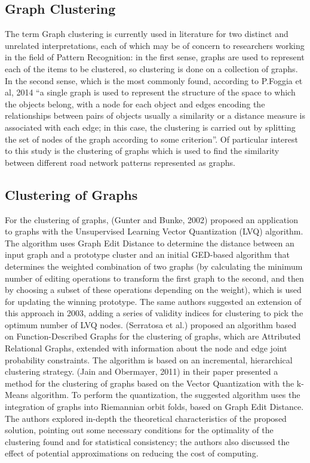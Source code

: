 \subsection{Graph Clustering}
The term Graph clustering is currently used in literature for two distinct and unrelated interpretations, each of which may be of concern to researchers working in the field of Pattern Recognition: in the first sense, graphs are used to represent each of the items to be clustered, so clustering is done on a collection of graphs. In the second sense, which is the most commonly found, according to P.Foggia et al, 2014 “a single graph is used to represent the structure of the space to which the objects belong, with a node for each object and edges encoding the relationships between pairs of objects usually a similarity or a distance measure is associated with each edge; in this case, the clustering is carried out by splitting the set of nodes of the graph according to some criterion”. Of particular interest to this study is the clustering of graphs which is used to find the similarity between different road network patterns represented as graphs.

\subsection{Clustering of Graphs}
For the clustering of graphs, (Gunter and Bunke, 2002) proposed an application to graphs with the Unsupervised Learning Vector Quantization (LVQ) algorithm. The algorithm uses Graph Edit Distance to determine the distance between an input graph and a prototype cluster and an initial GED-based algorithm that determines the weighted combination of two graphs (by calculating the minimum number of editing operations to transform the first graph to the second, and then by choosing a subset of these operations depending on the weight), which is used for updating the winning prototype. The same authors suggested an extension of this approach in 2003, adding a series of validity indices for clustering to pick the optimum number of LVQ nodes. (Serratosa et al.) proposed an algorithm based on Function-Described Graphs for the clustering of graphs, which are Attributed Relational Graphs, extended with information about the node and edge joint probability constraints. The algorithm is based on an incremental, hierarchical clustering strategy. (Jain and Obermayer, 2011) in their paper presented a method for the clustering of graphs based on the Vector Quantization with the k-Means algorithm. To perform the quantization, the suggested algorithm uses the integration of graphs into Riemannian orbit folds, based on Graph Edit Distance. The authors explored in-depth the theoretical characteristics of the proposed solution, pointing out some necessary conditions for the optimality of the clustering found and for statistical consistency; the authors also discussed the effect of potential approximations on reducing the cost of computing.


